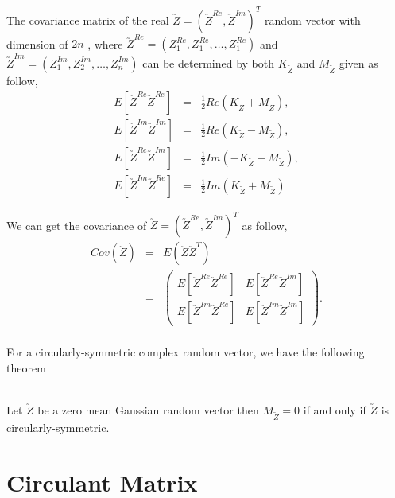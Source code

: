 The covariance matrix of the real $\utilde{Z}=(\utilde{Z}^{Re}, \utilde{Z}^{Im})^T$ random vector with dimension of $2n$ , where $\utilde{Z}^{Re} = (Z_1^{Re}, Z_1^{Re}, \ldots, Z_1^{Re})$ and $\utilde{Z}^{Im} =
(Z_1^{Im}, Z_2^{Im}, \ldots, Z_n^{Im})$ can be determined by both $K_{\utilde{Z}}$ and $M_{\utilde{Z}}$ given as follow,
\begin{eqnarray}
	E[\utilde{Z}^{Re}\utilde{Z}^{Re}] &=& \frac{1}{2}Re(K_{\utilde{Z}} + M_{\utilde{Z}}), \nonumber\\
	E[\utilde{Z}^{Im}\utilde{Z}^{Im}] &=& \frac{1}{2}Re(K_{\utilde{Z}} - M_{\utilde{Z}}), \nonumber\\
	E[\utilde{Z}^{Re}\utilde{Z}^{Im}] &=& \frac{1}{2}Im(-K_{\utilde{Z}} + M_{\utilde{Z}}), \nonumber\\
	E[\utilde{Z}^{Im}\utilde{Z}^{Re}] &=& \frac{1}{2}Im(K_{\utilde{Z}} + M_{\utilde{Z}}) \label{comlex_cov}
\end{eqnarray}

We can get the covariance of $\utilde{Z}=(\utilde{Z}^{Re}, \utilde{Z}^{Im})^T$ as follow,
\begin{eqnarray*}
	Cov(\utilde{Z}) &=& E(\utilde{Z}\utilde{Z}^T) \\
	&=& \left( \begin{array}{ll}
	E[\utilde{Z}^{Re}\utilde{Z}^{Re}] &  E[\utilde{Z}^{Re}\utilde{Z}^{Im}] \\
	E[\utilde{Z}^{Im}\utilde{Z}^{Re}] &  E[\utilde{Z}^{Im}\utilde{Z}^{Im}]
	\end{array}
	\right). \\
\end{eqnarray*}

For a circularly-symmetric complex random vector, we have the following theorem
\begin{theorem} \label{circular_theory} \hfill \\
	Let $\utilde{Z}$ be a zero mean Gaussian random vector then $M_{\utilde{Z}}=0$ if and only if $\utilde{Z}$ is circularly-symmetric.
\end{theorem}

\section{Circulant Matrix} \label{circulant}

